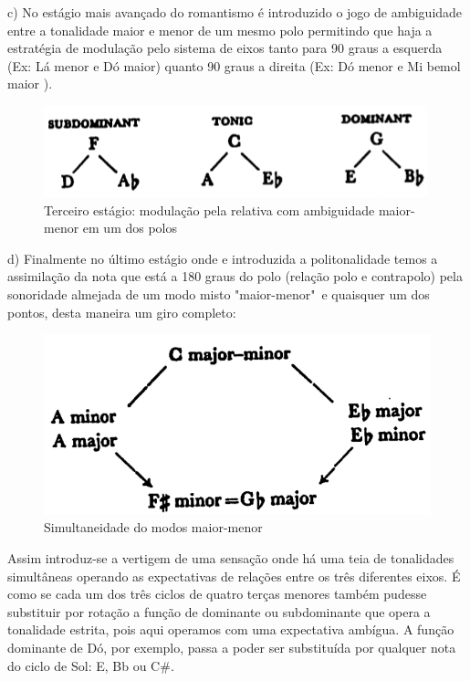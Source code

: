 \documentclass[
	12pt,				%
	openright,			%
	twoside,			%
	a4paper,			%
	english,			%
	french,				%
	spanish,			%
	brazil				%
	]{abntex2}
\begin{document}
c) No estágio mais avançado do romantismo é introduzido o jogo de ambiguidade entre a tonalidade maior e menor de um mesmo polo permitindo que haja a estratégia de modulação pelo sistema de eixos tanto para 90 graus a esquerda (Ex: Lá menor e Dó maior) quanto 90 graus a direita (Ex: Dó menor e Mi bemol maior ).

\begin{figure}[!h]
	\caption{\label{fig_grafico}Terceiro estágio: modulação pela relativa com ambiguidade maior-menor em um dos polos }
	\begin{center}
	    \includegraphics[scale=0.5]{axis/estagio03.png}
	\end{center}
\end{figure}


d) Finalmente no último estágio onde e introduzida a politonalidade temos a assimilação da nota que está a 180 graus do polo (relação polo e contrapolo) pela sonoridade almejada de um modo misto "maior-menor"\ e quaisquer um dos pontos, desta maneira um giro completo:


\begin{figure}[!h]
	\caption{\label{fig_grafico}Simultaneidade do modos maior-menor }
	\begin{center}
	    \includegraphics[scale=0.3]{axis/maiormenor.png}
	\end{center}
\end{figure}



Assim introduz-se a vertigem de uma sensação onde há uma teia de tonalidades simultâneas operando as expectativas de relações entre os três diferentes eixos. É como se cada um dos três ciclos de quatro terças menores também pudesse substituir por rotação a função de dominante ou subdominante que opera a tonalidade estrita, pois aqui operamos com uma expectativa ambígua. A função dominante de Dó, por exemplo, passa a poder ser substituída por qualquer nota do ciclo de Sol: E, Bb ou C\#.
\end{document}
